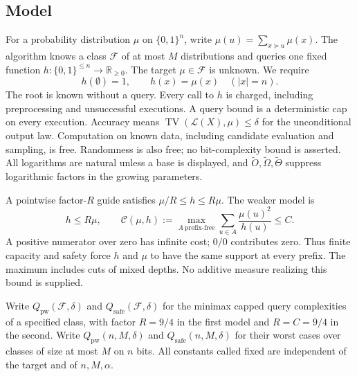 \documentclass[11pt]{article}
\theoremstyle{definition}\newtheorem{definition}[theorem]{Definition}
\theoremstyle{remark}\newtheorem{remark}[theorem]{Remark}
\newcommand{\TV}{\operatorname{TV}}
\newcommand{\bits}{\{0,1\}}
\newcommand{\F}{\mathcal F}
\newcommand{\CC}{\mathcal C}
\begin{document}
\subsection{Model}
For a probability distribution $\mu$ on $\bits^n$, write $\mu(u)=\sum_{x\succeq u}\mu(x)$. The algorithm knows a class $\F$ of at most $M$ distributions and queries one fixed function $h:\bits^{\le n}\to\mathbb R_{\ge0}$. The target $\mu\in\F$ is unknown. We require
\begin{equation}\label{eq:oracle}
 h(\emptyset)=1,\qquad h(x)=\mu(x)\quad(|x|=n).
\end{equation}
The root is known without a query. Every call to $h$ is charged, including preprocessing and unsuccessful executions. A query bound is a deterministic cap on every execution. Accuracy means $\TV(\mathcal L(X),\mu)\le\delta$ for the unconditional output law. Computation on known data, including candidate evaluation and sampling, is free. Randomness is also free; no bit-complexity bound is asserted. All logarithms are natural unless a base is displayed, and $\widetilde O,\widetilde\Omega,\widetilde\Theta$ suppress logarithmic factors in the growing parameters.

A pointwise factor-$R$ guide satisfies $\mu/R\le h\le R\mu$. The weaker model is
\begin{equation}\label{eq:capacity-model}
 h\le R\mu,\qquad
 \CC(\mu,h):=\max_{A\ \mathrm{prefix\text{-}free}}
                  \sum_{u\in A}\frac{\mu(u)^2}{h(u)}\le C.
\end{equation}
A positive numerator over zero has infinite cost; $0/0$ contributes zero. Thus finite capacity and safety force $h$ and $\mu$ to have the same support at every prefix. The maximum includes cuts of mixed depths. No additive measure realizing this bound is supplied.

Write $Q_{\mathrm{pw}}(\F,\delta)$ and $Q_{\mathrm{safe}}(\F,\delta)$ for the minimax capped query complexities of a specified class, with factor $R=9/4$ in the first model and $R=C=9/4$ in the second. Write $Q_{\mathrm{pw}}(n,M,\delta)$ and $Q_{\mathrm{safe}}(n,M,\delta)$ for their worst cases over classes of size at most $M$ on $n$ bits. All constants called fixed are independent of the target and of $n,M,\alpha$.
\end{document}
